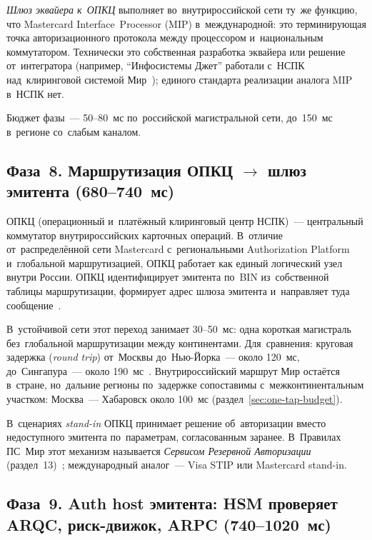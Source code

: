 \emph{Шлюз эквайера к~ОПКЦ} выполняет во~внутрироссийской сети ту~же функцию,
что Mastercard Interface~Processor (MIP) в~международной: это терминирующая
точка авторизационного протокола между процессором и~национальным коммутатором. Технически это собственная разработка эквайера
или решение от~интегратора (например, \enquote{Инфосистемы Джет} работали с~НСПК
над~клиринговой системой Мир~\cite{tadviser-jet-mir-clearing}); единого
стандарта реализации аналога MIP в~НСПК нет.

Бюджет фазы~--- 50--80~мс по~российской магистральной сети, до~150~мс в~регионе
со~слабым каналом.

\subsection*{Фаза~8. Маршрутизация ОПКЦ \ensuremath{\rightarrow} шлюз эмитента (680--740~мс)}

ОПКЦ (операционный и~платёжный клиринговый центр НСПК)~--- центральный
коммутатор внутрироссийских карточных операций. В~отличие от~распределённой
сети Mastercard с~региональными Authorization Platform и~глобальной
маршрутизацией, ОПКЦ работает как единый логический узел внутри России.
ОПКЦ идентифицирует эмитента по~BIN из~собственной таблицы маршрутизации,
формирует адрес шлюза эмитента и~направляет туда сообщение~\cite{nspk-about-company,cnews-nspk-opkc}.

В~устойчивой сети этот переход занимает 30--50~мс: одна короткая магистраль
без~глобальной маршрутизации между континентами. Для~сравнения: круговая
задержка (\textit{round trip}) от~Москвы до~Нью-Йорка~--- около 120~мс,
до~Сингапура~--- около 190~мс~\cite{wondernetwork-pings-moscow}. Внутрироссийский
маршрут Мир остаётся в~стране, но~дальние регионы по~задержке сопоставимы
с~межконтинентальным участком: Москва~--- Хабаровск около 100~мс
(раздел~\ref{sec:one-tap-budget}).

В~сценариях \textit{stand-in} ОПКЦ принимает решение об~авторизации вместо
недоступного эмитента по~параметрам, согласованным заранее. В~Правилах ПС~Мир
этот механизм называется \emph{Сервисом Резервной Авторизации}
(раздел~13)~\cite{nspk-mir-rules-v43}; международный аналог~--- Visa STIP
или Mastercard stand-in.

\subsection*{Фаза~9. Auth host эмитента: HSM проверяет ARQC, риск-движок, ARPC (740--1020~мс)}

